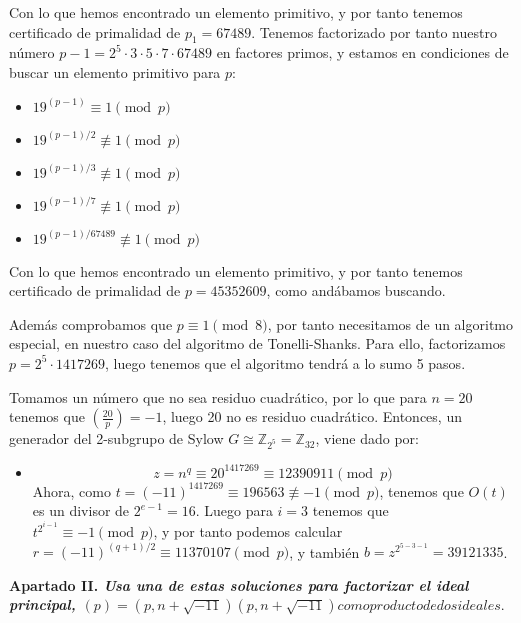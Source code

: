 \documentclass[fleqn]{article}
\def\Z{\mathds{Z}}
\begin{document}
    Con lo que hemos encontrado un elemento primitivo, y por tanto tenemos certificado de primalidad de $p_1 = 67489$.
    Tenemos factorizado por tanto nuestro número $p-1 = 2^5 \cdot 3 \cdot 5 \cdot 7 \cdot 67489$ en factores primos, y estamos en condiciones de buscar un elemento 
    primitivo para $p$:

    \begin{itemize}
        \item $19^{(p - 1)} \equiv 1 \pmod{p}$
        \item $19^{(p - 1)/2} \not\equiv 1 \pmod{p}$    
        \item $19^{(p - 1)/3} \not\equiv 1 \pmod{p}$
        \item $19^{(p - 1)/7} \not\equiv 1 \pmod{p}$
        \item $19^{(p - 1)/67489} \not\equiv 1 \pmod{p}$
    \end{itemize}

    Con lo que hemos encontrado un elemento primitivo, y por tanto tenemos certificado de primalidad de $p = 45352609$, como andábamos buscando.
    
    Además comprobamos que $p \equiv 1 \pmod{8}$, por tanto necesitamos de un algoritmo especial, en nuestro caso del algoritmo de Tonelli-Shanks.
    Para ello, factorizamos $p = 2^5 \cdot 1417269$, luego tenemos que el algoritmo tendrá a lo sumo 5 pasos.

    Tomamos un número que no sea residuo cuadrático, por lo que para $n=20$ tenemos que $\left(\frac{20}{p}\right) = -1$, luego 20 no es residuo cuadrático.
    Entonces, un generador del 2-subgrupo de Sylow $ G \cong \Z_{2^5} = \Z_{32}$, viene dado por:
    \begin{itemize}
        \item $$z = n^q \equiv 20^{1417269} \equiv 12390911 \pmod{p}$$
                Ahora, como $t = (-11)^1417269 \equiv 196563 \not\equiv -1 \pmod{p}$, 
                tenemos que $O(t)$ es un divisor de $2^{e-1}=16$. Luego para $i = 3$ tenemos que $t^{2^{i-1}} \equiv -1 \pmod{p} $, y por tanto
                podemos calcular $r = (-11)^{(q+1)/2} \equiv 11370107 \pmod{p}$, y también $b = z^{2^{5-3-1}} = 39121335$.
    \end{itemize}





    \newpage
    \textbf{Apartado II. \textit{Usa una de estas soluciones para factorizar el ideal principal, 
                                $(p) = (p, n+ \sqrt{-11})(p, n+ \sqrt{-11}) como producto de dos ideales.$}}\\
\end{document}

